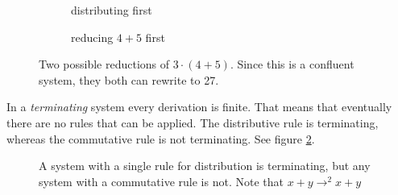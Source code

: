 \documentclass{book}
\theoremstyle{definition}
\begin{document}
\begin{figure}[h]
  \begin{subfigure}{.5\textwidth}
      \centering
      \caption{distributing first}
  \end{subfigure}
  \begin{subfigure}{.5\textwidth}
      \centering
      \caption{reducing $4 + 5$ first}
  \end{subfigure}
    \caption{Two possible reductions of $3\cdot(4 + 5)$.  
             Since this is a confluent system, they both can rewrite to 27.}
    \label{fig:confluent}
\end{figure}

In a \emph{terminating} system every derivation is finite.
That means that eventually there are no rules that can be applied.
The distributive rule is terminating, 
whereas the commutative rule is not terminating.  See figure \ref{fig:terminate}.

\begin{figure}[h]
  \begin{subfigure}{.5\textwidth}
    \centering
  \end{subfigure}
  \begin{subfigure}{.5\textwidth}
    \centering
  \end{subfigure}
    \caption{A system with a single rule for distribution is terminating,
             but any system with a commutative rule is not.
             Note that $x + y \to^2 x + y$}
    \label{fig:terminate}
\end{figure}
\end{document}
